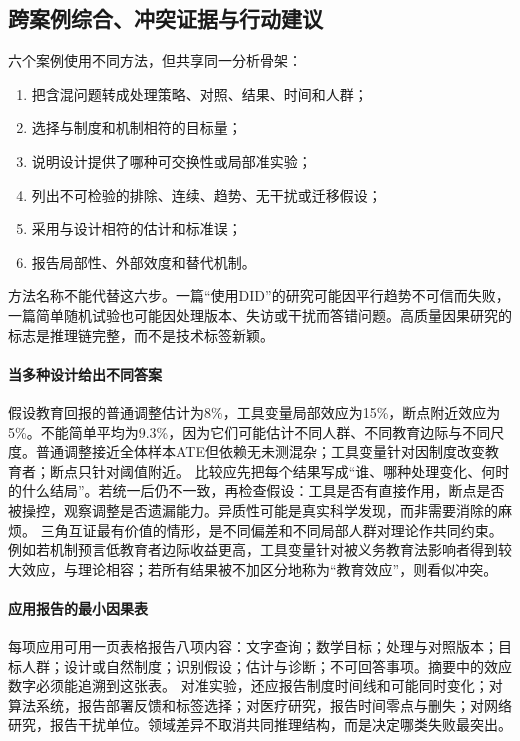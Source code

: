 \subsection{跨案例综合、冲突证据与行动建议}

六个案例使用不同方法，但共享同一分析骨架：

\begin{enumerate}
  \item 把含混问题转成处理策略、对照、结果、时间和人群；
  \item 选择与制度和机制相符的目标量；
  \item 说明设计提供了哪种可交换性或局部准实验；
  \item 列出不可检验的排除、连续、趋势、无干扰或迁移假设；
  \item 采用与设计相符的估计和标准误；
  \item 报告局部性、外部效度和替代机制。
\end{enumerate}

方法名称不能代替这六步。一篇“使用DID”的研究可能因平行趋势不可信而失败，一篇简单随机试验也可能因处理版本、失访或干扰而答错问题。高质量因果研究的标志是推理链完整，而不是技术标签新颖。

\paragraph{当多种设计给出不同答案}

假设教育回报的普通调整估计为8\%，工具变量局部效应为15\%，断点附近效应为5\%。不能简单平均为9.3\%，因为它们可能估计不同人群、不同教育边际与不同尺度。普通调整接近全体样本ATE但依赖无未测混杂；工具变量针对因制度改变教育者；断点只针对阈值附近。
比较应先把每个结果写成“谁、哪种处理变化、何时的什么结局”。若统一后仍不一致，再检查假设：工具是否有直接作用，断点是否被操控，观察调整是否遗漏能力。异质性可能是真实科学发现，而非需要消除的麻烦。
三角互证最有价值的情形，是不同偏差和不同局部人群对理论作共同约束。例如若机制预言低教育者边际收益更高，工具变量针对被义务教育法影响者得到较大效应，与理论相容；若所有结果被不加区分地称为“教育效应”，则看似冲突。

\paragraph{应用报告的最小因果表}

每项应用可用一页表格报告八项内容：文字查询；数学目标；处理与对照版本；目标人群；设计或自然制度；识别假设；估计与诊断；不可回答事项。摘要中的效应数字必须能追溯到这张表。
对准实验，还应报告制度时间线和可能同时变化；对算法系统，报告部署反馈和标签选择；对医疗研究，报告时间零点与删失；对网络研究，报告干扰单位。领域差异不取消共同推理结构，而是决定哪类失败最突出。


